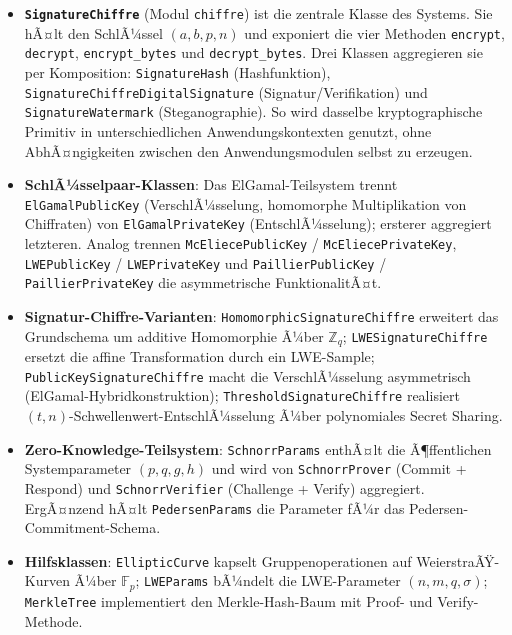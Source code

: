 ﻿\documentclass[a4paper,12pt]{scrreprt}
\theoremstyle{definition}
\begin{document}
\begin{itemize}
	\item \textbf{\texttt{SignatureChiffre}} (Modul \texttt{chiffre}) ist die zentrale Klasse des Systems. Sie hÃ¤lt den SchlÃ¼ssel $(a, b, p, n)$ und exponiert die vier Methoden \texttt{encrypt}, \texttt{decrypt}, \texttt{encrypt\_bytes} und \texttt{decrypt\_bytes}. Drei Klassen aggregieren sie per Komposition: \texttt{Signature\-Hash} (Hashfunktion), \texttt{SignatureChiffreDigitalSigna\newline ture} (Signatur\-/Verifikation) und \texttt{SignatureWatermark} (Steganographie). So wird dasselbe kryptographische Primitiv in unterschiedlichen Anwendungskontexten genutzt, ohne AbhÃ¤ngigkeiten zwischen den Anwendungsmodulen selbst zu erzeugen.
	\item \textbf{SchlÃ¼sselpaar-Klassen}: Das ElGamal-Teilsystem trennt \texttt{ElGamalPublicKey} (VerschlÃ¼sselung, homomorphe Multiplikation von Chiffraten) von \texttt{ElGamalPrivate\newline Key} (EntschlÃ¼sselung); ersterer aggregiert letzteren. Analog trennen \texttt{McEliece\newline PublicKey} / \texttt{McEliecePrivateKey}, \texttt{LWEPublicKey} / \texttt{LWEPrivateKey} und \texttt{PaillierPublicKey} / \texttt{PaillierPrivateKey} die asymmetrische FunktionalitÃ¤t.
	\item \textbf{Signatur-Chiffre-Varianten}: \texttt{HomomorphicSignatureChiffre} erweitert das Grundschema um additive Homomorphie Ã¼ber $\mathbb{Z}_q$; \texttt{LWESignatureChiffre} ersetzt die affine Transformation durch ein LWE-Sample; \texttt{PublicKeySignatureChiffre} macht die VerschlÃ¼sselung asymmetrisch (ElGamal-Hybridkonstruktion); \texttt{Threshold\newline SignatureChiffre} realisiert $(t,n)$-Schwellenwert-EntschlÃ¼sselung Ã¼ber polynomiales Secret Sharing.
	\item \textbf{Zero-Knowledge-Teilsystem}: \texttt{SchnorrParams} enthÃ¤lt die Ã¶ffentlichen Systemparameter $(p,q,g,h)$ und wird von \texttt{SchnorrProver} (Commit + Respond) und \texttt{SchnorrVerifier} (Challenge + Verify) aggregiert. ErgÃ¤nzend hÃ¤lt \texttt{Pedersen\newline Params} die Parameter fÃ¼r das Pedersen-Commitment-Schema.
	\item \textbf{Hilfsklassen}: \texttt{EllipticCurve} kapselt Gruppenoperationen auf WeierstraÃŸ-Kurven Ã¼ber $\mathbb{F}_p$; \texttt{LWEParams} bÃ¼ndelt die LWE-Parameter $(n, m, q, \sigma)$; \texttt{MerkleTree} implementiert den Merkle-Hash-Baum mit Proof- und Verify-Methode.
\end{itemize}
\end{document}
